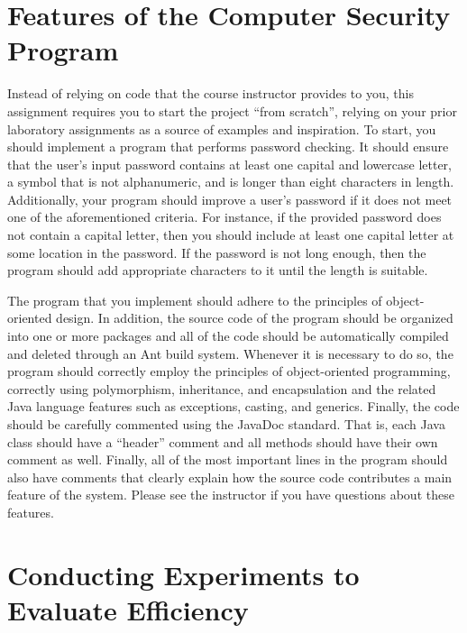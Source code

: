 \vspace*{-.05in}
\section*{Features of the Computer Security Program}
\vspace*{-.05in}

Instead of relying on code that the course instructor provides to you, this assignment requires you to start the project
``from scratch'', relying on your prior laboratory assignments as a source of examples and inspiration. To start, you
should implement a program that performs password checking. It should ensure that the user's input password contains at
least one capital and lowercase letter, a symbol that is not alphanumeric, and is longer than eight characters in
length. Additionally, your program should improve a user's password if it does not meet one of the aforementioned
criteria. For instance, if the provided password does not contain a capital letter, then you should include at least one
capital letter at some location in the password. If the password is not long enough, then the program should add
appropriate characters to it until the length is suitable.

The program that you implement should adhere to the principles of object-oriented design. In addition, the source code
of the program should be organized into one or more packages and all of the code should be automatically compiled and
deleted through an Ant build system. Whenever it is necessary to do so, the program should correctly employ the
principles of object-oriented programming, correctly using polymorphism, inheritance, and encapsulation and the related
Java language features such as exceptions, casting, and generics. Finally, the code should be carefully commented using
the JavaDoc standard. That is, each Java class should have a ``header'' comment and all methods should have their own
comment as well. Finally, all of the most important lines in the program should also have comments that clearly explain
how the source code contributes a main feature of the system. Please see the instructor if you have questions about
these features.

\vspace*{-.05in}
\section*{Conducting Experiments to Evaluate Efficiency}
\vspace*{-.05in}

